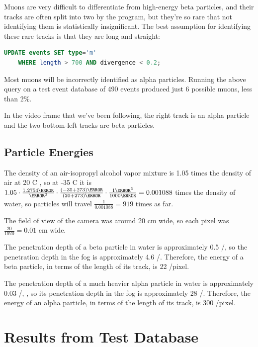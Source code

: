 \documentclass[notitlepage,12pt]{article}
\newcommand{\mycite}[1]{\cite{#1}}
\begin{document}
Muons are very difficult to differentiate from high-energy beta particles, and their tracks are often split into two by the program, but they're so rare that not identifying them is statistically insignificant.  The best assumption for identifying these rare tracks is that they are long and straight:
\begin{lstlisting}[language=SQL]
UPDATE events SET type='m' 
    WHERE length > 700 AND divergence < 0.2;
\end{lstlisting}

Most muons will be incorrectly identified as alpha particles.  Running the above query on a test event database of 490 events produced just 6 possible muons, less than 2\%.

In the video frame that we've been following, the right track is an alpha particle and the two bottom-left tracks are beta particles.

\subsection{Particle Energies}

The density of an air-isopropyl alcohol vapor mixture is 1.05 times the density of air at 20 \degree{}C \mycite{isopropanol}, so at -35 \degree{}C it is $1.05 \cdot \frac{1.2754 \kilogram}{\metre^3} \cdot \frac{(-35+273) \kelvin}{(20+273) \kelvin} \cdot \frac{1 \metre^3}{1000 \kilogram} = 0.001088$ times the density of water, so particles will travel $\frac{1}{0.001088}=919$ times as far.

The field of view of the camera was around 20 cm wide, so each pixel was $\frac{20}{1920} = 0.01$ cm wide. 

The penetration depth of a beta particle in water is approximately 0.5 \centi{}\meter/\mega{}\electronvolt \mycite{penetration}, so the penetration depth in the fog is approximately 4.6 \meter/\mega{}\electronvolt.   Therefore, the energy of a beta particle, in terms of the length of its track, is 22 \electronvolt/pixel.

The penetration depth of a much heavier alpha particle in water is approximately 0.03 \centi{}\meter/\mega{}\electronvolt \mycite{penetration}, \mycite{energies}, so its penetration depth in the fog is approximately 28 \centi{}\meter/\mega{}\electronvolt.  Therefore, the energy of an alpha particle, in terms of the length of its track, is 300 \electronvolt/pixel.

\section{Results from Test Database}
\end{document}
